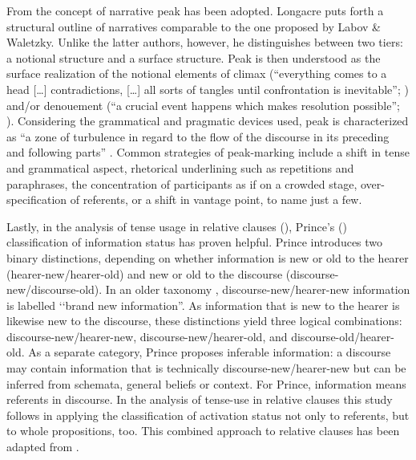 From \citet{LongacreR1996} the concept of narrative peak has been adopted. Longacre puts forth a structural outline of narratives comparable to the one proposed by Labov \& Waletzky. Unlike the latter authors, however, he distinguishes between two tiers: a notional structure and a surface structure. Peak is then understood as the surface realization of the notional elements of climax (``everything comes to a head […] contradictions, […] all sorts of tangles until confrontation is inevitable''; \citealt[35]{LongacreR1996}) and/or denouement (``a crucial event happens which makes resolution possible''; \citealt[35]{LongacreR1996}). Considering the grammatical and pragmatic devices used, peak is characterized as ``a zone of turbulence in regard to the flow of the discourse in its preceding and following parts'' \citep[38]{LongacreR1996}. Common strategies of peak-marking include a shift in tense and grammatical aspect, rhetorical underlining such as repetitions and paraphrases, the concentration of participants as if on a crowded stage, over-specification of referents, or a shift in vantage point, to name just a few.

Lastly, in the analysis of tense usage in relative clauses (), Prince's (\citeyear{PrinceEF1992}) classification of information status has proven helpful. Prince introduces two binary distinctions, depending on whether information is new or old to the hearer (hearer-new/hearer-old) and new or old to the discourse (discourse-new/discourse-old). In an older taxonomy \citep{PrinceEF1981}, discourse-new/hearer-new information is labelled \lq\lq brand new information''. As information that is new to the hearer is likewise new to the discourse, these distinctions yield three logical combinations: discourse-new/hearer-new, discourse-new/hearer-old, and discourse-old/hearer-old. As a separate category, Prince proposes inferable information: a discourse may contain information that is technically discourse-new/hearer-new but can be inferred from schemata, general beliefs or context. For Prince, information means referents in discourse. In the analysis of tense-use in relative clauses this study follows \citet{LevinsohnH2007} in applying the classification of activation status not only to referents, but to whole propositions, too. This combined approach to relative clauses has been adapted from \citet{KarelsJ2014}.  